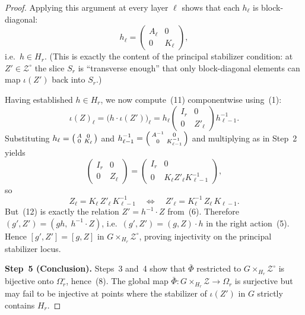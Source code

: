 \documentclass{article}
\theoremstyle{definition}
\begin{document}
\begin{proof}
Applying this argument at every layer $\ell$ shows that each $h_\ell$ is block-diagonal:
\[
h_\ell = \begin{pmatrix} A_\ell & 0 \\ 0 & K_\ell \end{pmatrix},
\]
i.e.\ $h \in H_r$.  (This is exactly the content of the principal stabilizer condition: at $Z' \in \mathcal{Z}^{\circ}$ the slice $S_r$ is ``transverse enough'' that only block-diagonal elements can map $\iota(Z')$ back into $S_r$.)

Having established $h \in H_r$, we now compute~(11) componentwise using~(1):
\[
\iota(Z)_\ell = \bigl(h \cdot \iota(Z')\bigr)_\ell = h_\ell \begin{pmatrix} I_r & 0 \\ 0 & Z'_\ell \end{pmatrix} h_{\ell-1}^{-1}.
\]
Substituting $h_\ell = \begin{psmallmatrix} A & 0 \\ 0 & K_\ell \end{psmallmatrix}$ and $h_{\ell-1}^{-1} = \begin{psmallmatrix} A^{-1} & 0 \\ 0 & K_{\ell-1}^{-1} \end{psmallmatrix}$ and multiplying as in Step~2 yields
\[
\begin{pmatrix} I_r & 0 \\ 0 & Z_\ell \end{pmatrix}
= \begin{pmatrix} I_r & 0 \\ 0 & K_\ell Z'_\ell K_{\ell-1}^{-1} \end{pmatrix},
\]
so
\begin{equation}\tag{12}
Z_\ell = K_\ell\, Z'_\ell\, K_{\ell-1}^{-1} \quad\iff\quad Z'_\ell = K_\ell^{-1}\, Z_\ell\, K_{\ell-1}.
\end{equation}
But~(12) is exactly the relation $Z' = h^{-1} \cdot Z$ from~(6). Therefore $(g', Z') = (gh,\; h^{-1} \cdot Z)$, i.e.\ $(g', Z') = (g, Z) \cdot h$ in the right action~(5). Hence $[g', Z'] = [g, Z]$ in $G \times_{H_r} \mathcal{Z}^{\circ}$, proving injectivity on the principal stabilizer locus.

\medskip
\textbf{Step~5 (Conclusion).} Steps~3 and~4 show that $\bar\Phi$ restricted to $G \times_{H_r} \mathcal{Z}^{\circ}$ is bijective onto $\Omega_r^{\circ}$, hence~(8). The global map $\bar\Phi \colon G \times_{H_r} \mathcal{Z} \to \Omega_r$ is surjective but may fail to be injective at points where the stabilizer of $\iota(Z')$ in $G$ strictly contains $H_r$.
\end{proof}
\end{document}
